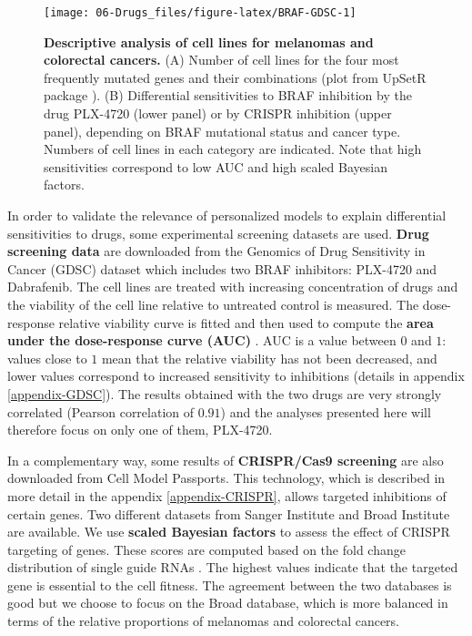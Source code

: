 \documentclass[a4paper,12pt,twoside,onecolumn,openright,final,oldfontcommands]{memoir}
\begin{document}
\begin{figure}

{\centering \texttt{[image: 06-Drugs\_files/figure-latex/BRAF-GDSC-1]} 

}

\caption[Descriptive analysis of cell lines for melanomas and colorectal cancers]{\textbf{Descriptive analysis of cell lines for
melanomas and colorectal cancers.} (A) Number of cell lines for the four
most frequently mutated genes and their combinations (plot from UpSetR
package \citep{conway2017upsetr}). (B) Differential sensitivities to
BRAF inhibition by the drug PLX-4720 (lower panel) or by CRISPR
inhibition (upper panel), depending on BRAF mutational status and cancer
type. Numbers of cell lines in each category are indicated. Note that
high sensitivities correspond to low AUC and high scaled Bayesian
factors.}\label{fig:BRAF-GDSC}
\end{figure}











In order to validate the relevance of personalized models to explain
differential sensitivities to drugs, some experimental screening
datasets are used. \textbf{Drug screening data} are downloaded from the
Genomics of Drug Sensitivity in Cancer (GDSC) dataset
\citep{yang2012genomics} which includes two BRAF inhibitors: PLX-4720
and Dabrafenib. The cell lines are treated with increasing concentration
of drugs and the viability of the cell line relative to untreated
control is measured. The dose-response relative viability curve is
fitted and then used to compute the \textbf{area under the dose-response
curve (AUC)} \citep{vis2016multilevel}. AUC is a value between \(0\) and
\(1\): values close to \(1\) mean that the relative viability has not
been decreased, and lower values correspond to increased sensitivity to
inhibitions (details in appendix \ref{appendix-GDSC}). The results
obtained with the two drugs are very strongly correlated (Pearson
correlation of \(0.91\)) and the analyses presented here will therefore
focus on only one of them, PLX-4720.

In a complementary way, some results of \textbf{CRISPR/Cas9 screening}
are also downloaded from Cell Model Passports. This technology, which is
described in more detail in the appendix \ref{appendix-CRISPR}, allows
targeted inhibitions of certain genes. Two different datasets from
Sanger Institute \citep{behan2019prioritization} and Broad Institute
\citep{meyers2017computational} are available. We use \textbf{scaled
Bayesian factors} to assess the effect of CRISPR targeting of genes.
These scores are computed based on the fold change distribution of
single guide RNAs \citep{hart2016bagel}. The highest values indicate
that the targeted gene is essential to the cell fitness. The agreement
between the two databases is good \citep{dempster2019agreement} but we
choose to focus on the Broad database, which is more balanced in terms
of the relative proportions of melanomas and colorectal cancers.
\end{document}
